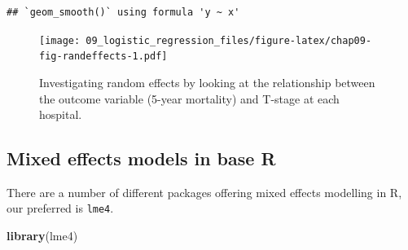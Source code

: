 \documentclass[
  12pt,
  krantz2]{krantz}
\makeatletter
\newenvironment{Shaded}{\begin{snugshade}}{\end{snugshade}}
\newcommand{\CommentTok}[1]{\textcolor[rgb]{0.56,0.35,0.01}{\textit{#1}}}
\newcommand{\DataTypeTok}[1]{\textcolor[rgb]{0.13,0.29,0.53}{#1}}
\newcommand{\DecValTok}[1]{\textcolor[rgb]{0.00,0.00,0.81}{#1}}
\newcommand{\FloatTok}[1]{\textcolor[rgb]{0.00,0.00,0.81}{#1}}
\newcommand{\KeywordTok}[1]{\textcolor[rgb]{0.13,0.29,0.53}{\textbf{#1}}}
\newcommand{\NormalTok}[1]{#1}
\newcommand{\OperatorTok}[1]{\textcolor[rgb]{0.81,0.36,0.00}{\textbf{#1}}}
\newcommand{\OtherTok}[1]{\textcolor[rgb]{0.56,0.35,0.01}{#1}}
\newcommand{\StringTok}[1]{\textcolor[rgb]{0.31,0.60,0.02}{#1}}
\newenvironment{kframe}{%
\medskip{}
\setlength{\fboxsep}{.8em}
 \def\at@end@of@kframe{}%
 \ifinner\ifhmode%
  \def\at@end@of@kframe{\end{minipage}}%
  \begin{minipage}{\columnwidth}%
 \fi\fi%
 \def\FrameCommand##1{\hskip\@totalleftmargin \hskip-\fboxsep
 \colorbox{shadecolor}{##1}\hskip-\fboxsep
     \hskip-\linewidth \hskip-\@totalleftmargin \hskip\columnwidth}%
 \MakeFramed {\advance\hsize-\width
   \@totalleftmargin\z@ \linewidth\hsize
   \@setminipage}}%
 {\par\unskip\endMakeFramed%
 \at@end@of@kframe}
\renewenvironment{Shaded}{\begin{kframe}}{\end{kframe}}
\makeatother
\begin{document}
\begin{Shaded}
\end{Shaded}

\begin{verbatim}
## `geom_smooth()` using formula 'y ~ x'
\end{verbatim}

\begin{figure}
\centering
\texttt{[image: 09\_logistic\_regression\_files/figure-latex/chap09-fig-randeffects-1.pdf]}
\caption{\label{fig:chap09-fig-randeffects}Investigating random effects by looking at the relationship between the outcome variable (5-year mortality) and T-stage at each hospital.}
\end{figure}

\hypertarget{mixed-effects-models-in-base-r}{%
\subsection{Mixed effects models in base R}\label{mixed-effects-models-in-base-r}}

There are a number of different packages offering mixed effects modelling in R, our preferred is \texttt{lme4}.

\begin{Shaded}
\begin{Highlighting}[]
\KeywordTok{library}\NormalTok{(lme4)}
\end{Highlighting}
\end{Shaded}
\end{document}
